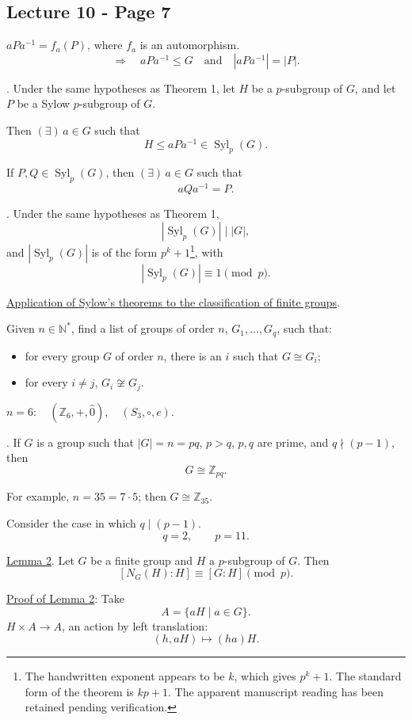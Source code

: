 \bigskip

\subsection*{Lecture 10 - Page 7}

\noindent $aPa^{-1}=f_a(P)$, where $f_a$ is an automorphism.
\[
\Longrightarrow\quad aPa^{-1}\leq G
\quad\text{and}\quad |aPa^{-1}|=|P|.
\]

\bigskip
\noindent{}. Under the same hypotheses
as Theorem 1, let $H$ be a $p$-subgroup of $G$, and let $P$ be a Sylow
$p$-subgroup of $G$.

\medskip
\noindent Then $(\exists)\,a\in G$ such that
\[
H\leq aPa^{-1}\in\operatorname{Syl}_p(G).
\]

\noindent If $P,Q\in\operatorname{Syl}_p(G)$, then
$(\exists)\,a\in G$ such that
\[
aQa^{-1}=P.
\]

\bigskip
\noindent{}. Under the same hypotheses
as Theorem 1,
\[
|\operatorname{Syl}_p(G)|\mid |G|,
\]
\noindent and $|\operatorname{Syl}_p(G)|$ is of the form
$p^k+1$\footnote{The handwritten exponent appears to be $k$,
which gives $p^k+1$. The standard form of the theorem is $kp+1$.
The apparent manuscript reading has been retained pending verification.},
with
\[
|\operatorname{Syl}_p(G)|\equiv1\pmod p.
\]

\bigskip
\noindent\underline{Application of Sylow's theorems to the classification
of finite groups}.

\medskip
\noindent Given $n\in\mathbb{N}^{*}$, find a list of groups of order $n$,
$G_1,\ldots,G_q$, such that:
\begin{itemize}
\item for every group $G$ of order $n$, there is an $i$ such that $G\cong G_i$;
\item for every $i\neq j$, $G_i\not\cong G_j$.
\end{itemize}

\noindent $n=6:\quad (\mathbb{Z}_6,+,\hat 0),\quad(S_3,\circ,e).$

\bigskip
\noindent{}. If $G$ is a group such that
$|G|=n=pq$, $p>q$, $p,q$ are prime, and $q\nmid(p-1)$,
then
\[
G\cong\mathbb{Z}_{pq}.
\]

\medskip
\noindent For example, $n=35=7\cdot5$; then $G\cong\mathbb{Z}_{35}$.

\noindent Consider the case in which $q\mid(p-1)$.
\[
q=2,\qquad p=11.
\]

\bigskip
\noindent\underline{Lemma 2}. Let $G$ be a finite group and
$H$ a $p$-subgroup of $G$. Then
\[
[N_G(H):H]\equiv[G:H]\pmod p.
\]

\medskip
\noindent\underline{Proof of Lemma 2}: Take
\[
A=\{aH\mid a\in G\}.
\]
\noindent $H\times A\longrightarrow A$, an action by left translation:
\[
(h,aH)\longmapsto(ha)H.
\]

